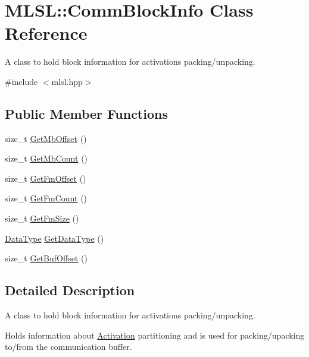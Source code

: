 \hypertarget{classMLSL_1_1CommBlockInfo}{\section{M\-L\-S\-L\-:\-:Comm\-Block\-Info Class Reference}
\label{classMLSL_1_1CommBlockInfo}
}


A class to hold block information for activations packing/unpacking.  




{\ttfamily \#include $<$mlsl.\-hpp$>$}

\subsection*{Public Member Functions}
\begin{DoxyCompactItemize}
\item 
size\-\_\-t \hyperlink{classMLSL_1_1CommBlockInfo_aa7f6567949a34c4f644b13c351ded78b}{Get\-Mb\-Offset} ()
\item 
size\-\_\-t \hyperlink{classMLSL_1_1CommBlockInfo_a07f0b0ec811eb98644847cfbf431efc2}{Get\-Mb\-Count} ()
\item 
size\-\_\-t \hyperlink{classMLSL_1_1CommBlockInfo_a8314af2bdbfe3d5193315374a769589e}{Get\-Fm\-Offset} ()
\item 
size\-\_\-t \hyperlink{classMLSL_1_1CommBlockInfo_aa3748f33c500ebfc9ce5396ac15fc75f}{Get\-Fm\-Count} ()
\item 
size\-\_\-t \hyperlink{classMLSL_1_1CommBlockInfo_adcdb538a542426be853fabb14513ce4c}{Get\-Fm\-Size} ()
\item 
\hyperlink{namespaceMLSL_a09825f36959e78645dd9bc70bdf840ba}{Data\-Type} \hyperlink{classMLSL_1_1CommBlockInfo_af4de10f37568c71b78aed7c8be925ea4}{Get\-Data\-Type} ()
\item 
size\-\_\-t \hyperlink{classMLSL_1_1CommBlockInfo_a32520c2683fa63dcb02985b3f5308502}{Get\-Buf\-Offset} ()
\end{DoxyCompactItemize}


\subsection{Detailed Description}
A class to hold block information for activations packing/unpacking. 

Holds information about \hyperlink{classMLSL_1_1Activation}{Activation} partitioning and is used for packing/upacking to/from the communication buffer. 

